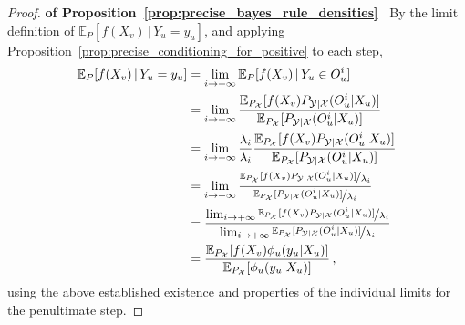 \documentclass[twoside,11pt]{article}
\newcommand{\states}{\mathcal{X}}
\newcommand{\observs}{\mathcal{Y}}
\begin{document}
\begin{proof}{\bf of Proposition~\ref{prop:precise_bayes_rule_densities}~}
By the limit definition of $\mathbb{E}_P[f(X_v)\,\vert\,Y_u=y_u]$, and applying Proposition~\ref{prop:precise_conditioning_for_positive} to each step,
\begin{align*}
\mathbb{E}_P[f(X_v)\,\vert\,Y_u=y_u] &= \lim_{i\to+\infty} \mathbb{E}_P[f(X_v)\,\vert\,Y_u\in O_u^i] \\
 &= \lim_{i\to+\infty} \frac{\mathbb{E}_{P_\states}[f(X_v)P_{\observs\vert\states}(O_u^i\vert X_u)]}{\mathbb{E}_{P_\states}[P_{\observs\vert\states}(O_u^i\vert X_u)]} \\
 &= \lim_{i\to+\infty} \frac{\lambda_i}{\lambda_i}\frac{\mathbb{E}_{P_\states}[f(X_v)P_{\observs\vert\states}(O_u^i\vert X_u)]}{\mathbb{E}_{P_\states}[P_{\observs\vert\states}(O_u^i\vert X_u)]} \\
 &= \lim_{i\to+\infty} \frac{\nicefrac{\mathbb{E}_{P_\states}[f(X_v)P_{\observs\vert\states}(O_u^i\vert X_u)]}{\lambda_i}}{\nicefrac{\mathbb{E}_{P_\states}[P_{\observs\vert\states}(O_u^i\vert X_u)]}{\lambda_i}} \\
 &= \frac{\lim_{i\to+\infty} \nicefrac{\mathbb{E}_{P_\states}[f(X_v)P_{\observs\vert\states}(O_u^i\vert X_u)]}{\lambda_i}}{\lim_{i\to+\infty} \nicefrac{\mathbb{E}_{P_\states}[P_{\observs\vert\states}(O_u^i\vert X_u)]}{\lambda_i}} \\
 &= \frac{\mathbb{E}_{P_\states}[f(X_v)\phi_u(y_u\vert X_u)]}{\mathbb{E}_{P_\states}[\phi_u(y_u\vert X_u)]}\,,
\end{align*}
using the above established existence and properties of the individual limits for the penultimate step.

\end{proof}
\end{document}
